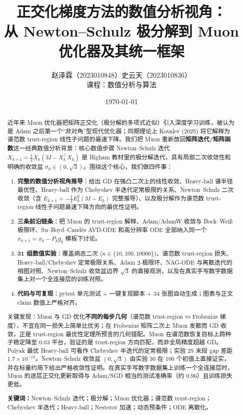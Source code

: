 \documentclass[10.5pt,a4paper]{ctexart}
\title{%
  正交化梯度方法的数值分析视角：\\
  从 Newton--Schulz 极分解到 Muon 优化器及其统一框架
}
\author{%
  赵泽霖（2023010848）\quad 史云天（2023010836）\\
  \small 课程：数值分析与算法
}
\date{\today}
\begin{document}
\maketitle
\thispagestyle{empty}

\begin{abstract}
近年来 Muon 优化器把矩阵正交化（极分解的多项式近似）引入深度学习训练，被认为是 Adam 之后第一个``非对角''型现代优化器；同期理论上 Kovalev (2025) 将它解释为谱范数 trust-region 线性子问题的最速下降。我们把 Muon 重新放回\textbf{矩阵迭代/矩阵函数}这一经典数值分析背景：核心数值步骤 Newton--Schulz 迭代 $X_{k+1} = \tfrac{1}{2}X_k(3I - X_k^\top X_k)$ 是 Higham 教材里的极分解迭代，具有局部二次收敛性和明确的收敛盆 $\sigma_0\in(0,\sqrt 3)$。围绕这个核心，我们做四件事：
\begin{enumerate}[nosep]
  \item \textbf{完整的数值分析视角推导}：给出 GD 在强凸二次上的线性收敛、Heavy-ball 谱半径最优性、Heavy-ball 作为 Chebyshev 半迭代定常极限的关系、Newton--Schulz 二次收敛（含 $E_{k+1}=-\tfrac{1}{4}E_k^2(3I-E_k)$ 完整推导）、以及极分解作为谱范数 trust-region 线性子问题最速下降方向的最优性证明。
  \item \textbf{三条前沿链条}：把 Muon 的 trust-region 解释、Adam/AdamW 收敛与 Bock--Wei{\ss} 极限环、Su--Boyd--Cand{\`e}s AVD-ODE 和高分辨率 ODE 全部纳入同一个 $x_{k+1}=x_k-P_k g_k$ 模板下讨论。
  \item \textbf{31 组数值实验}：覆盖病态二次 ($\kappa\in\{10,100,10000\}$)、谱范数 trust-region 损失、Heavy-ball/Chebyshev 定常极限关系、Adam 2-极限环、NAG-ODE 与离散迭代的相图对照、Newton--Schulz 收敛盆边界 $\sqrt 3$ 的直接观测，以及在真实手写数字数据集上对一个全连接层的训练对照。
  \item \textbf{代码与可复现}：pytest 单元测试 + 一键复现脚本 + 34 张图自动生成；图表与正文 claim 数值上严格对齐。
\end{enumerate}

关键发现：Muon 与 GD 优化\textbf{不同的每步几何}（谱范数 trust-region vs Frobenius 梯度），不宜在同一损失上简单比优劣；在 Frobenius 矩阵二次上 Muon 发散而 GD 收敛，正是 trust-region 最优性定理所预言的几何错配。Muon 在谱范数恢复目标上跨种子稳定降至 $0.03$ 平台，验证的是 trust-region 方向匹配，而非全局精度超越 GD。Polyak 最优 Heavy-ball 可看作 Chebyshev 半迭代的定常极限；实验 25 末段 gap 差距 $1.7\times 10^{-13}$。Newton--Schulz 收敛盆 $(0,\sqrt 3)$ 由实验 30 在 100 个初值上直接证实，并在标量约简下给出严格收敛性证明。在真实手写数字数据集上训练一个全连接层时，Muon 的逐层正交化更新取得与 Adam/SGD 相当的测试准确率（约 $0.96$）且训练损失更低。

\medskip
\noindent\textbf{关键词：}Newton--Schulz 迭代；极分解；Muon 优化器；谱范数 trust-region；Chebyshev 半迭代；Heavy-ball；Nesterov 加速；动态预条件；ODE 离散化。
\end{abstract}
\end{document}
